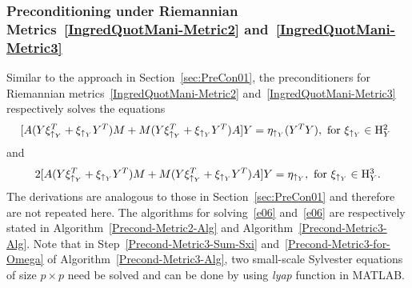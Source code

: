 \documentclass[11pt]{article}
\numberwithin{equation}{section}
\begin{document}
\subsubsection{Preconditioning under Riemannian Metrics~\eqref{IngredQuotMani-Metric2} and~\eqref{IngredQuotMani-Metric3}}

Similar to the approach in Section~\ref{sec:PreCon01}, the preconditioners for Riemannian metrics~\eqref{IngredQuotMani-Metric2} and~\eqref{IngredQuotMani-Metric3} respectively solves the equations
\begin{equation} \label{e06}
[A(Y\xi_{\uparrow_Y}^T+\xi_{\uparrow_Y}Y^T)M+M(Y\xi_{\uparrow_Y}^T+\xi_{\uparrow_Y}Y^T)A]Y=\eta_{\uparrow_Y}(Y^TY), \hbox{ for $\xi_{\uparrow_Y} \in \mathrm{H}_Y^2$ }
\end{equation}
and
\begin{equation} \label{e07}
  2[A(Y\xi_{\uparrow_Y}^T+\xi_{\uparrow_Y}Y^T)M+M(Y\xi_{\uparrow_Y}^T+\xi_{\uparrow_Y}Y^T)A]Y=\eta_{\uparrow_Y}, \hbox{ for $\xi_{\uparrow_Y} \in \mathrm{H}_Y^3$}.
\end{equation}
The derivations are analogous to those in Section~\ref{sec:PreCon01} and therefore are not repeated here. The algorithms for solving~\eqref{e06} and~\eqref{e06} are respectively stated in Algorithm~\ref{Precond-Metric2-Alg} and Algorithm~\ref{Precond-Metric3-Alg}. Note that in Step~\ref{Precond-Metric3-Sum-Sxi} and~\ref{Precond-Metric3-for-Omega} of Algorithm~\ref{Precond-Metric3-Alg}, two small-scale Sylvester equations of size $p\times p$ need be solved and can be done by using \textit{lyap} function in MATLAB. 


\end{document}
